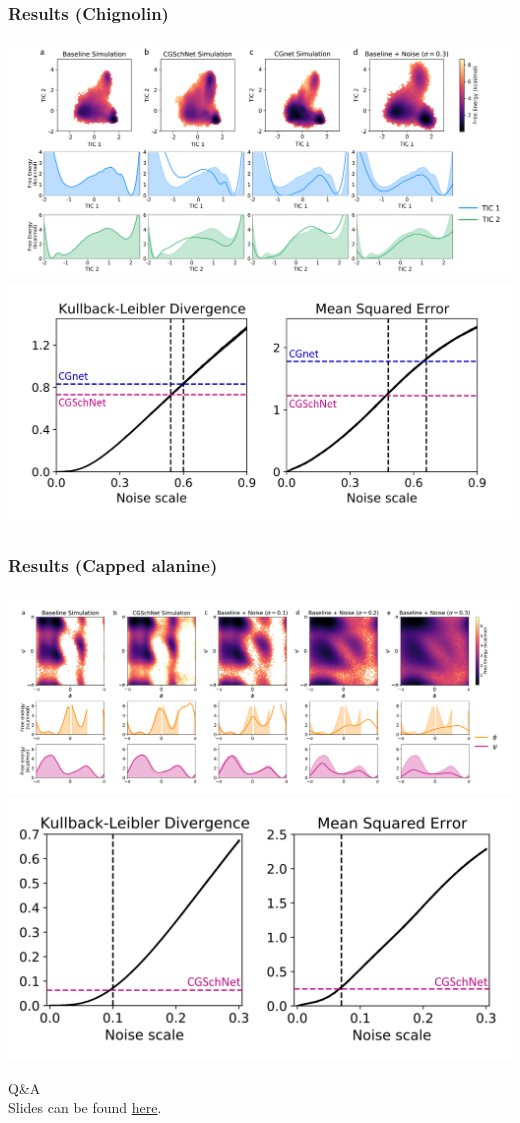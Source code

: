 \documentclass{beamer}
\begin{document}
\begin{frame}
  \frametitle{Results (Chignolin)}
  \begin{center}
    \includegraphics[width=0.6\linewidth]{./chignolin_results.png}
    \includegraphics[width=0.6\linewidth]{./chignolin_divergence.png}
  \end{center}
\end{frame}
\begin{frame}
  \frametitle{Results (Capped alanine)}
  \begin{center}
    \includegraphics[width=0.6\linewidth]{./alanine_results.png}
    \includegraphics[width=0.6\linewidth]{./alanine_divergence.png}
  \end{center}
\end{frame}
\begin{frame}
  \begin{center}
    \Huge Q\&A\\
    Slides can be found \href{https://github.com/andychenbruce/CSE290D-presentation/}{here}.
  \end{center}
\end{frame}
\end{document}
